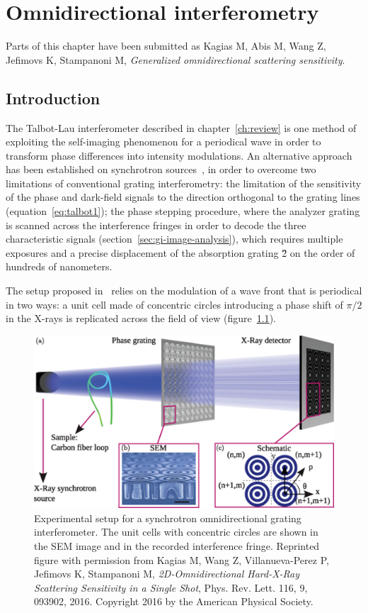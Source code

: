 \chapter{Omnidirectional interferometry}\label{ch:omnidirectional}
Parts of this chapter have been submitted as Kagias M, Abis M, Wang Z,
Jefimovs K, Stampanoni M,
\emph{Generalized omnidirectional scattering sensitivity}.

\section{Introduction}
The Talbot-Lau interferometer described in chapter~\ref{ch:review} is one
method of exploiting the self-imaging phenomenon for a periodical wave in
order to transform phase differences into intensity modulations.
An alternative approach has been established on synchrotron
sources~\parencite{PhysRevLett.116.093902}, in order to overcome two limitations
of conventional grating interferometry: the limitation of the sensitivity of
the phase and dark-field signals to the direction orthogonal to the grating
lines (equation~\ref{eq:talbot1}); the phase stepping procedure, where
the analyzer grating is scanned across the interference fringes in order to
decode the three characteristic signals
(section~\ref{sec:gi-image-analysis}), which requires multiple exposures and
a precise displacement of the absorption grating \G2 on the order of
hundreds of nanometers.

The setup proposed in~\parencite{PhysRevLett.116.093902} relies on the modulation
of a wave front that is periodical in two ways: a unit cell made of
concentric circles introducing a phase shift of $\pi/2$ in the X-rays is
replicated across the field of view
(figure~\ref{fig:omnidirectional-synchrotron}).

\begin{figure}[htb]
    \centering
    \includegraphics[width=\textwidth]{gfx/omnidirectional/synchrotron-design.png}
    \caption{Experimental setup for a synchrotron omnidirectional grating
    interferometer. The unit cells with concentric circles are shown in the
    \ac{SEM} image and in the recorded interference fringe. Reprinted figure
with permission from Kagias M, Wang Z, Villanueva-Perez P, Jefimovs K,
Stampanoni M, \emph{2D-Omnidirectional Hard-X-Ray Scattering Sensitivity in
a Single Shot}, Phys. Rev. Lett. 116, 9, 093902, 2016. Copyright 2016 by the
American Physical Society.}
    \label{fig:omnidirectional-synchrotron}
\end{figure}

